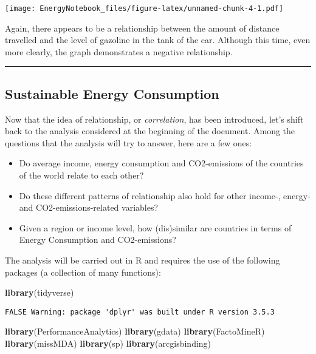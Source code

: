 \documentclass[]{article}
\newenvironment{Shaded}{\begin{snugshade}}{\end{snugshade}}
\newcommand{\KeywordTok}[1]{\textcolor[rgb]{0.13,0.29,0.53}{\textbf{#1}}}
\newcommand{\NormalTok}[1]{#1}
\begin{document}
\texttt{[image: EnergyNotebook\_files/figure-latex/unnamed-chunk-4-1.pdf]}

Again, there appears to be a relationship between the amount of distance
travelled and the level of gazoline in the tank of the car. Although
this time, even more clearly, the graph demonstrates a negative
relationship.

\begin{center}\rule{0.5\linewidth}{\linethickness}\end{center}

\subsection{Sustainable Energy
Consumption}\label{sustainable-energy-consumption}

Now that the idea of relationship, or \emph{correlation}, has been
introduced, let's shift back to the analysis considered at the beginning
of the document. Among the questions that the analysis will try to
answer, here are a few ones:

\begin{itemize}
\item
  Do average income, energy consumption and CO2-emissions of the
  countries of the world relate to each other?
\item
  Do these different patterns of relationship also hold for other
  income-, energy- and CO2-emissions-related variables?
\item
  Given a region or income level, how (dis)similar are countries in
  terms of Energy Consumption and CO2-emissions?
\end{itemize}

The analysis will be carried out in R and requires the use of the
following packages (a collection of many functions):

\begin{Shaded}
\begin{Highlighting}[]
\KeywordTok{library}\NormalTok{(tidyverse)}
\end{Highlighting}
\end{Shaded}

\begin{verbatim}
FALSE Warning: package 'dplyr' was built under R version 3.5.3
\end{verbatim}

\begin{Shaded}
\begin{Highlighting}[]
\KeywordTok{library}\NormalTok{(PerformanceAnalytics)}
\KeywordTok{library}\NormalTok{(gdata)}
\KeywordTok{library}\NormalTok{(FactoMineR)}
\KeywordTok{library}\NormalTok{(missMDA)}
\KeywordTok{library}\NormalTok{(sp)}
\KeywordTok{library}\NormalTok{(arcgisbinding)}
\end{Highlighting}
\end{Shaded}
\end{document}
